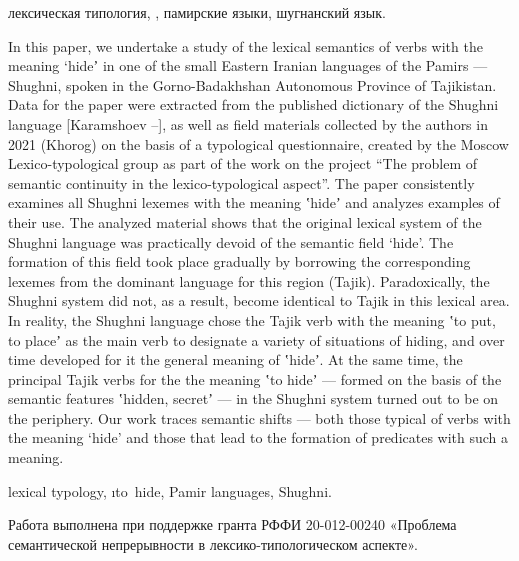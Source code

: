 \begin{keywords}
лексическая типология, , памирские языки, шугнанский язык.
\end{keywords}

\begin{eng-abstract}
In this paper, we undertake a study of the lexical semantics of verbs with the meaning ‘hideʼ in one of the small Eastern Iranian languages of the Pamirs — Shughni, spoken in the Gorno-Badakhshan Autonomous Province of Tajikistan. Data for the paper were extracted from the published dictionary of the Shughni language [Karamshoev \cite*{karamshoev1988}–\cite*{karamshoev1999}], as well as field materials collected by the authors in 2021 (Khorog) on the basis of a typological questionnaire, created by the Moscow Lexico-typological group as part of the work on the project “The problem of semantic continuity in the lexico-typological aspect”. The paper consistently examines all Shughni lexemes with the meaning ʽhideʼ and analyzes examples of their use. The analyzed material shows that the original lexical system of the Shughni language was practically devoid of the semantic field ‘hide’. The formation of this field took place gradually by borrowing the corresponding lexemes from the dominant language for this region (Tajik). Paradoxically, the Shughni system did not, as a result, become identical to Tajik in this lexical area. In reality, the Shughni language chose the Tajik verb with the meaning ʽto put, to placeʼ as the main verb to designate a variety of situations of hiding, and over time developed for it the general meaning of ʽhideʼ. At the same time, the principal Tajik verbs for the the meaning ʽto hideʼ — formed on the basis of the semantic features ʽhidden, secretʼ — in the Shughni system turned out to be on the periphery. Our work traces semantic shifts — both those typical of verbs with the meaning ‘hide’ and those that lead to the formation of predicates with such a meaning.
\end{eng-abstract}

\begin{eng-keywords}
lexical typology, \i{{\sc to~hide}}, Pamir languages, Shughni.
\end{eng-keywords}

\begin{acknowledgements}
Работа выполнена при поддержке гранта РФФИ 20-012-00240 «Проблема семантической непрерывности в лексико-типологическом аспекте».
\label{hide-acknow}
\end{acknowledgements}

